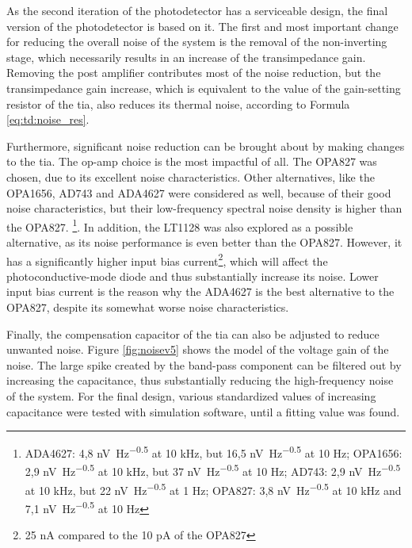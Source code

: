 As the second iteration of the photodetector has a serviceable design, the final version of the photodetector is based on it. The first and most important change for reducing the overall noise of the system is the removal of the non-inverting stage, which necessarily results in an increase of the transimpedance gain. Removing the post amplifier contributes most of the noise reduction, but the transimpedance gain increase, which is equivalent to the value of the gain-setting resistor of the \gls{tia}, also reduces its thermal noise, according to Formula \eqref{eq:td:noise_res}.

Furthermore, significant noise reduction can be brought about by making changes to the \gls{tia}. The op-amp choice is the most impactful of all. The OPA827 was chosen, due to its excellent noise characteristics. Other alternatives, like the OPA1656, AD743 and ADA4627 were considered as well, because of their good noise characteristics, but their low-frequency spectral noise density is higher than the OPA827. \footnote{ADA4627: 4,8 \unit[power-half-as-sqrt]{\nano\volt\per\hertz\tothe{0.5}} at 10 \unit{\kilo\hertz}, but 16,5 \unit[power-half-as-sqrt]{\nano\volt\per\hertz\tothe{0.5}} at 10 \unit{\hertz}; OPA1656: 2,9 \unit[power-half-as-sqrt]{\nano\volt\per\hertz\tothe{0.5}} at 10 \unit{\kilo\hertz}, but 37 \unit[power-half-as-sqrt]{\nano\volt\per\hertz\tothe{0.5}} at 10 \unit{\hertz}; AD743: 2,9 \unit[power-half-as-sqrt]{\nano\volt\per\hertz\tothe{0.5}} at 10 \unit{\kilo\hertz}, but 22 \unit[power-half-as-sqrt]{\nano\volt\per\hertz\tothe{0.5}} at 1 \unit{\hertz}; OPA827: 3,8 \unit[power-half-as-sqrt]{\nano\volt\per\hertz\tothe{0.5}} at 10 \unit{\kilo\hertz} and 7,1 \unit[power-half-as-sqrt]{\nano\volt\per\hertz\tothe{0.5}} at 10 \unit{\hertz}}.
In addition, the LT1128 was also explored as a possible alternative, as its noise performance is even better than the OPA827. However, it has a significantly higher input bias current\footnote{25 \unit{\nano\ampere} compared to the 10 \unit{\pico\ampere} of the OPA827}, which will affect the photoconductive-mode diode and thus substantially increase its noise. Lower input bias current is the reason why the ADA4627 is the best alternative to the OPA827, despite its somewhat worse noise characteristics.

Finally, the compensation capacitor of the \gls{tia} can also be adjusted to reduce unwanted noise. Figure \ref{fig:noisev5} shows the model of the voltage gain of the noise. The large spike created by the band-pass component can be filtered out by increasing the capacitance, thus substantially reducing the high-frequency noise of the system. For the final design, various standardized values of increasing capacitance were tested with simulation software, until a fitting value was found.

